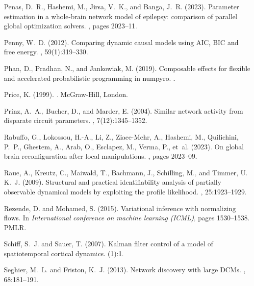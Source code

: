 \documentclass[12pt]{article}
\begin{document}
\begin{thebibliography}{}
Penas, D.~R., Hashemi, M., Jirsa, V.~K., and Banga, J.~R. (2023).
\newblock Parameter estimation in a whole-brain network model of epilepsy:
  comparison of parallel global optimization solvers.
, pages 2023--11.

Penny, W.~D. (2012).
\newblock Comparing dynamic causal models using {AIC}, {BIC} and free energy.
, 59(1):319--330.

Phan, D., Pradhan, N., and Jankowiak, M. (2019).
\newblock Composable effects for flexible and accelerated probabilistic
  programming in numpyro.
.

Price, K. (1999).
.
\newblock McGraw-Hill, London.

Prinz, A.~A., Bucher, D., and Marder, E. (2004).
\newblock Similar network activity from disparate circuit parameters.
, 7(12):1345--1352.

Rabuffo, G., Lokossou, H.-A., Li, Z., Ziaee-Mehr, A., Hashemi, M., Quilichini,
  P.~P., Ghestem, A., Arab, O., Esclapez, M., Verma, P., et~al. (2023).
\newblock On global brain reconfiguration after local manipulations.
, pages 2023--09.

Raue, A., Kreutz, C., Maiwald, T., Bachmann, J., Schilling, M., and Timmer, U.
  K.~J. (2009).
\newblock Structural and practical identifiability analysis of partially
  observable dynamical models by exploiting the profile likelihood.
, 25:1923--1929.

Rezende, D. and Mohamed, S. (2015).
\newblock Variational inference with normalizing flows.
\newblock In {\em International conference on machine learning (ICML)}, pages
  1530--1538. PMLR.

Schiff, S.~J. and Sauer, T. (2007).
\newblock Kalman filter control of a model of spatiotemporal cortical dynamics.
(1):1.

Seghier, M.~L. and Friston, K.~J. (2013).
\newblock Network discovery with large {DCMs}.
, 68:181--191.


\end{thebibliography}
\end{document}
